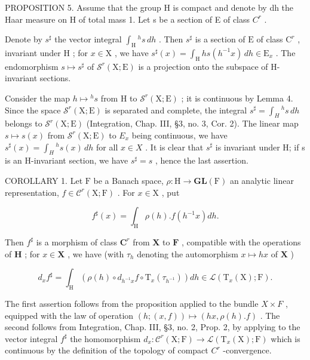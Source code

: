 PROPOSITION 5. Assume that the group H is compact and denote by dh the Haar measure on H of total mass 1. Let s be a section of E of class \(C^{r}\) .

Denote by \(s^{\sharp}\) the vector integral \(\int_{\mathrm{H}}{}^{h}s\,dh\) . Then \(s^{\sharp}\) is a section of \(\mathrm{E}\) of class \(\mathrm{C}^r\) , invariant under \(\mathrm{H}\) ; for \(x \in \mathrm{X}\) , we have \(s^{\sharp}(x) = \int_{\mathrm{H}}hs(h^{-1}x)\,dh \in \mathrm{E}_x\) . The endomorphism \(s \mapsto s^{\sharp}\) of \(\mathcal{S}^r(\mathrm{X};\mathrm{E})\) is a projection onto the subspace of H-invariant sections.

Consider the map \(h \mapsto {}^{h}s\) from H to \(\mathcal{S}^{r}(\mathrm{X};\mathrm{E})\) ; it is continuous by Lemma 4. Since the space \(\mathcal{S}^{r}(\mathrm{X};\mathrm{E})\) is separated and complete, the integral \(s^{\sharp} = \int_{H}{}^{h}s\,dh\) belongs to \(\mathcal{S}^{r}(\mathrm{X};\mathrm{E})\) (Integration, Chap. III, §3, no. 3, Cor. 2). The linear map \(s \mapsto s(x)\) from \(\mathcal{S}^{r}(\mathrm{X};\mathrm{E})\) to \(E_{x}\) being continuous, we have \(s^{\sharp}(x) = \int_{H}{}^{h}s(x)\,dh\) for all \(x \in X\) . It is clear that \(s^{\sharp}\) is invariant under H; if s is an H-invariant section, we have \(s^{\sharp} = s\) , hence the last assertion.

COROLLARY 1. Let \(\mathrm{F}\) be a Banach space, \(\rho : \mathrm{H} \to \mathbf{GL}(\mathrm{F})\) an analytic linear representation, \(f \in \mathcal{C}^r(\mathrm{X};\mathrm{F})\) . For \(x \in \mathrm{X}\) , put

\[
f ^ {\sharp} (x) = \int_ {\mathrm{H}} \rho (h). f (h ^ {- 1} x) d h.
\]

Then \(f^{\sharp}\) is a morphism of class \(\mathbf{C}^r\) from \(\mathbf{X}\) to \(\mathbf{F}\) , compatible with the operations of \(\mathbf{H}\) ; for \(x \in \mathbf{X}\) , we have (with \(\tau_h\) denoting the automorphism \(x \mapsto hx\) of \(\mathbf{X}\) )

\[
d _ {x} f ^ {\sharp} = \int_ {\mathrm{H}} (\rho (h) \circ d _ {h ^ {- 1} x} f \circ \mathrm{T} _ {x} (\tau_ {h ^ {- 1}})) d h \in \mathscr {L} (\mathrm{T} _ {x} (\mathrm{X}); \mathrm{F}).\tag{14}
\]

The first assertion follows from the proposition applied to the bundle \(X \times F\) , equipped with the law of operation \((h; (x, f)) \mapsto (hx, \rho(h).f)\) . The second follows from Integration, Chap. III, §3, no. 2, Prop. 2, by applying to the vector integral \(f^{\sharp}\) the homomorphism \(d_{x} : \mathcal{C}^{r}(\mathrm{X};\mathrm{F}) \to \mathcal{L}(\mathrm{T}_{x}(\mathrm{X});\mathrm{F})\) which is continuous by the definition of the topology of compact \(C^{r}\) -convergence.

